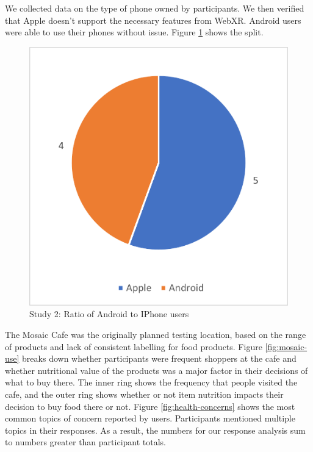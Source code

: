 \documentclass[thesis]{fputhesis}
\begin{document}
\begin{body}
We collected data on the type of phone owned by participants. We then verified that Apple doesn't support the necessary features from WebXR.  Android users were able to use their phones without issue. Figure \ref{fig:phoneOS} shows the split.
\begin{figure}[h]
    \centering
    \includegraphics[width=0.5\linewidth]{Images/Phone-split.png}
    \caption{Study 2: Ratio of Android to IPhone users}
    \label{fig:phoneOS}
\end{figure}

\newpage
The Mosaic Cafe was the originally planned testing location, based on the range of products and lack of consistent labelling for food products. Figure \ref{fig:mosaic-use} breaks down whether participants were frequent shoppers at the cafe and whether nutritional value of the products was a major factor in their decisions of what to buy there. The inner ring shows the frequency that people visited the cafe, and the outer ring shows whether or not item nutrition impacts their decision to buy food there or not. Figure \ref{fig:health-concerns} shows the most common topics of concern reported by users. Participants mentioned multiple topics in their responses.  As a result, the numbers for our response analysis sum to numbers greater than participant totals. 


\end{body}
\end{document}
